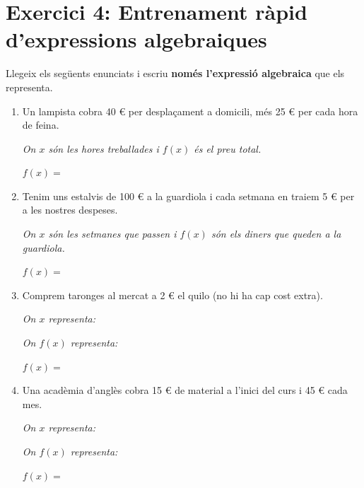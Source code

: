 \documentclass[12pt,a4paper]{article}
\begin{document}
\section*{Exercici 4: Entrenament ràpid d'expressions algebraiques}
Llegeix els següents enunciats i escriu \textbf{només l'expressió algebraica} que els representa. 

\begin{enumerate}[label=\arabic*.]
    \item Un lampista cobra 40 € per desplaçament a domicili, més 25 € per cada hora de feina.
    
    \textit{On $x$ són les hores treballades i $f(x)$ és el preu total.}
    
    $f(x) = $ 
    \vspace{0.3cm}
    
    \item Tenim uns estalvis de 100 € a la guardiola i cada setmana en traiem 5 € per a les nostres despeses. 
    
    \textit{On $x$ són les setmanes que passen i $f(x)$ són els diners que queden a la guardiola.}
    
    $f(x) = $ 
    \vspace{0.3cm}
    
    \item Comprem taronges al mercat a 2 € el quilo (no hi ha cap cost extra).
    
    \textit{On $x$ representa: } 
    
    \textit{On $f(x)$ representa: } 
    
    $f(x) = $ 
    \vspace{0.3cm}
    
    \item Una acadèmia d'anglès cobra 15 € de material a l'inici del curs i 45 € cada mes.
    
    \textit{On $x$ representa: } \
    
    \textit{On $f(x)$ representa: } 
    
    $f(x) = $ 
\end{enumerate}
\end{document}
